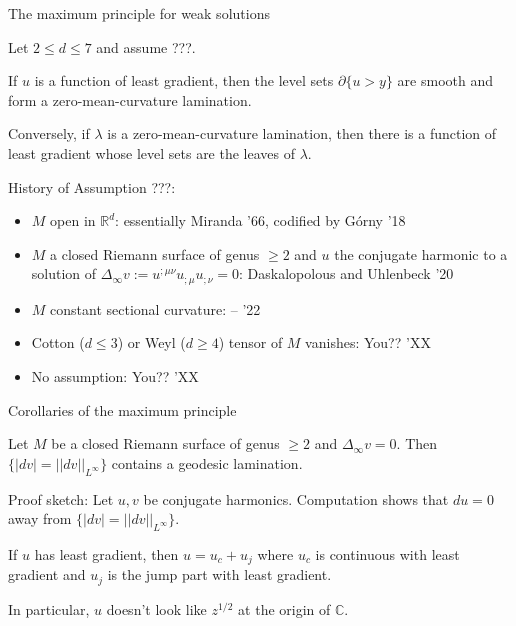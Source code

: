 \documentclass[10pt]{beamer}
\newcommand{\RR}{\mathbb{R}}
\newcommand{\CC}{\mathbb{C}}
\begin{document}
\begin{frame}{The maximum principle for weak solutions}
\begin{theorem}
Let $2 \leq d \leq 7$ and assume ???. \pause

If $u$ is a function of least gradient, then the level sets $\partial \{u > y\}$ are smooth and form a zero-mean-curvature lamination. \pause

Conversely, if $\lambda$ is a zero-mean-curvature lamination, then there is a function of least gradient whose level sets are the leaves of $\lambda$.
\end{theorem} \pause

History of Assumption ???: \pause
\begin{itemize}
\item $M$ open in $\RR^d$: essentially Miranda '66, codified by G\'orny '18\pause
\item $M$ a closed Riemann surface of genus $\geq 2$ and $u$ the conjugate harmonic to a solution of $\Delta_\infty v := u^{;\mu\nu} u_{;\mu} u_{;\nu} = 0$: Daskalopolous and Uhlenbeck '20\pause
\item $M$ constant sectional curvature: -- '22\pause
\item Cotton ($d \leq 3$) or Weyl ($d \geq 4$) tensor of $M$ vanishes: You?? 'XX\pause
\item No assumption: You?? 'XX 
\end{itemize}
\end{frame}

\begin{frame}{Corollaries of the maximum principle}
\begin{corollary}
Let $M$ be a closed Riemann surface of genus $\geq 2$ and $\Delta_\infty v = 0$. Then $\{|dv| = ||dv||_{L^\infty}\}$ contains a geodesic lamination.
\end{corollary}

\pause

Proof sketch: Let $u, v$ be conjugate harmonics. Computation shows that $du = 0$ away from $\{|dv| = ||dv||_{L^\infty}\}$.\pause

\begin{corollary}[G\'orny '18]
If $u$ has least gradient, then $u = u_c + u_j$ where $u_c$ is continuous with least gradient and $u_j$ is the jump part with least gradient.
\end{corollary}\pause
    
In particular, $u$ doesn't look like $z^{1/2}$ at the origin of $\CC$.
\end{frame}
\end{document}
